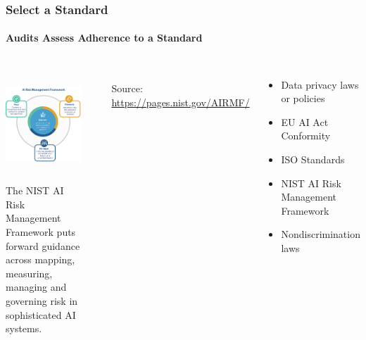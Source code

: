 \documentclass[11pt,
               aspectratio=169,
               hyperref={colorlinks}
               ]{beamer}
\begin{document}
		\begin{frame}
			
			\frametitle{Select a Standard}
			\framesubtitle{Audits Assess Adherence to a Standard}		
			
			\begin{columns}
				\centering
				\includegraphics[height=120pt]{../img/NIST_RMF_img1.png}\\
				\scriptsize{The NIST AI Risk Management Framework puts forward guidance across mapping, measuring, managing and governing risk in sophisticated AI systems.}
				
				\par\noindent\rule{100pt}{0.4pt}\\
				\vspace{5pt}
				\scriptsize{\tiny{Source: \url{https://pages.nist.gov/AIRMF/}}}
				
				\vspace{-5pt}
				\begin{itemize}
					\item Data privacy laws or policies
					\item EU AI Act Conformity
					\item ISO Standards
					\item NIST AI Risk Management Framework
					\item Nondiscrimination laws
				\end{itemize}
			\end{columns}

		\end{frame}
		
\end{document}
